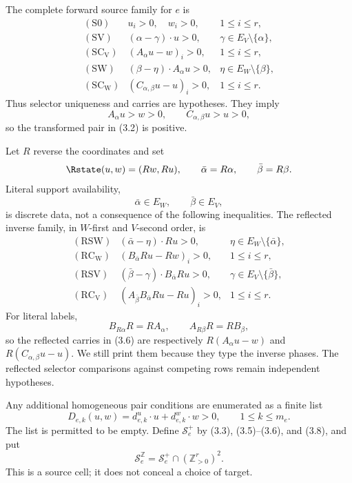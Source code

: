 \documentclass[11pt]{article}
\theoremstyle{definition}
\theoremstyle{remark}
\begin{document}
The complete forward source family for \(e\) is
\[
\begin{array}{rll}
\mathrm{(S0)}&u_i>0,\quad w_i>0,&1\leq i\leq r,\\
\mathrm{(SV)}&(\alpha-\gamma)\cdot u>0,
 &\gamma\in E_V\setminus\{\alpha\},\\
\mathrm{(SC_V)}&(A_\alpha u-w)_i>0,&1\leq i\leq r,\\
\mathrm{(SW)}&(\beta-\eta)\cdot A_\alpha u>0,
 &\eta\in E_W\setminus\{\beta\},\\
\mathrm{(SC_W)}&(C_{\alpha,\beta}u-u)_i>0,
 &1\leq i\leq r .
\end{array}
\tag{3.3}
\]
Thus selector uniqueness and carries are hypotheses.  They imply
\[
 A_\alpha u>w>0,\qquad C_{\alpha,\beta}u>u>0,
\tag{3.4}
\]
so the transformed pair in (3.2) is positive.

Let \(R\) reverse the coordinates and set
\[
 \Rstate(u,w)=(Rw,Ru),\qquad
 \bar\alpha=R\alpha,\qquad\bar\beta=R\beta .
\]
Literal support availability,
\[
 \bar\alpha\in E_W,\qquad \bar\beta\in E_V,
\tag{3.5}
\]
is discrete data, not a consequence of the following inequalities.  The
reflected inverse family, in \(W\)-first and \(V\)-second order, is
\[
\begin{array}{rll}
\mathrm{(RSW)}&(\bar\alpha-\eta)\cdot Ru>0,
 &\eta\in E_W\setminus\{\bar\alpha\},\\
\mathrm{(RC_W)}&(B_{\bar\alpha}Ru-Rw)_i>0,
 &1\leq i\leq r,\\
\mathrm{(RSV)}&(\bar\beta-\gamma)\cdot B_{\bar\alpha}Ru>0,
 &\gamma\in E_V\setminus\{\bar\beta\},\\
\mathrm{(RC_V)}&
 (A_{\bar\beta}B_{\bar\alpha}Ru-Ru)_i>0,
 &1\leq i\leq r .
\end{array}
\tag{3.6}
\]
For literal labels,
\[
 B_{R\alpha}R=RA_\alpha,\qquad A_{R\beta}R=RB_\beta,
\tag{3.7}
\]
so the reflected carries in (3.6) are respectively
\(R(A_\alpha u-w)\) and \(R(C_{\alpha,\beta}u-u)\).  We still print them
because they type the inverse phases.  The reflected selector comparisons
against competing rows remain independent hypotheses.

Any additional homogeneous pair conditions are enumerated as a finite list
\[
 D_{e,k}(u,w)=d^u_{e,k}\cdot u+d^w_{e,k}\cdot w>0,
 \qquad 1\leq k\leq m_e.
\tag{3.8}
\]
The list is permitted to be empty.  Define \(\mathcal S_e^+\) by (3.3),
(3.5)--(3.6), and (3.8), and put
\[
 \mathcal S_e^{\mathbb Z}
 =\mathcal S_e^+\cap(\mathbb Z_{>0}^{r})^2.
\tag{3.9}
\]
This is a source cell; it does not conceal a choice of target.
\end{document}
